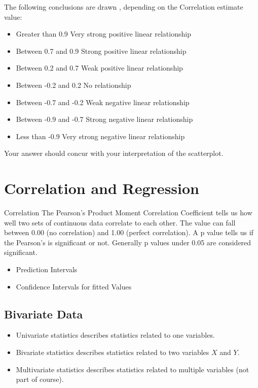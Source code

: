 \documentclass[]{report}
\begin{document}
The following conclusions are drawn , depending on the Correlation estimate value:
\begin{itemize}
	\item Greater than 0.9 		Very strong positive linear relationship 
	\item Between 0.7 and 0.9		Strong positive linear relationship 
	\item Between 0.2 and 0.7	 	Weak positive linear relationship
	\item Between -0.2 and 0.2		No relationship
	\item Between -0.7 and -0.2		Weak negative linear relationship
	\item Between -0.9 and -0.7		Strong negative linear relationship
	\item Less than -0.9			Very strong negative linear relationship
\end{itemize}
Your answer should concur with your interpretation of the scatterplot.




\section{Correlation and Regression}
Correlation
The Pearson's Product Moment Correlation Coefficient tells us how well two sets of continuous data correlate to each other. The value can fall between 0.00 (no correlation) and 1.00 (perfect correlation). A p value tells us if the Pearson's is significant or not. Generally p values under 0.05 are considered significant.

\begin{itemize}
	\item Prediction Intervals
	\item Confidence Intervals for fitted Values
\end{itemize}



\subsection{Bivariate Data}
\begin{itemize}
	\item Univariate statistics describes statistics related to one variables.
	\item Bivariate statistics describes statistics related to two variables $X$ and $Y$.
	\item Multivariate statistics describes statistics related to multiple variables (not part of course).
\end{itemize}
\end{document}
